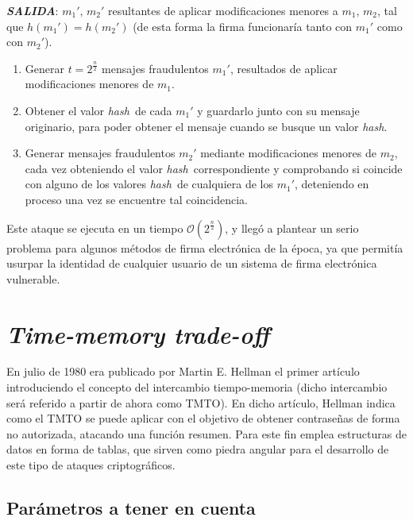 \documentclass[12pt,spanish,listoffigures,listoftables]{tfgetsinf}
\newcommand{\hash}{\textit{hash}}
\begin{document}
\textit{\textbf{SALIDA}}: $m_1',\, m_2'$ resultantes de aplicar modificaciones menores a $m_1,\, m_2$, tal que $h(m_1') = h(m_2')$ (de esta forma la firma funcionaría tanto con $m_1'$ como con $m_2'$).

\begin{enumerate}

	\item Generar $t = 2^{\frac{n}{2}}$ mensajes fraudulentos $m_1'$, resultados de aplicar modificaciones menores de $m_1$.

	\item Obtener el valor \hash~de cada $m_1'$ y guardarlo junto con su mensaje originario, para poder obtener el mensaje cuando se busque un valor \hash.

	\item Generar mensajes fraudulentos $m_2'$ mediante modificaciones menores de $m_2$, cada vez obteniendo el valor \hash~correspondiente y comprobando si coincide con alguno de los valores \hash~de cualquiera de los $m_1'$, deteniendo en proceso una vez se encuentre tal coincidencia.

\end{enumerate}

Este ataque se ejecuta en un tiempo $\mathcal{O}(2^{\frac{n}{2}})$, y llegó a plantear un serio problema para algunos métodos de firma electrónica de la época, ya que permitía usurpar la identidad de cualquier usuario de un sistema de firma electrónica vulnerable.

\section{\textit{Time-memory trade-off}} \label{tmto}

En julio de 1980 era publicado por Martin E. Hellman el primer artículo introduciendo el concepto del intercambio tiempo-memoria \cite{hellman}(dicho intercambio será referido a partir de ahora como TMTO). En dicho artículo, Hellman indica como el TMTO se puede aplicar con el objetivo de obtener contraseñas de forma no autorizada, atacando una función resumen. Para este fin emplea estructuras de datos en forma de tablas, que sirven como piedra angular para el desarrollo de este tipo de ataques criptográficos.

\subsection{Parámetros a tener en cuenta}
\end{document}
